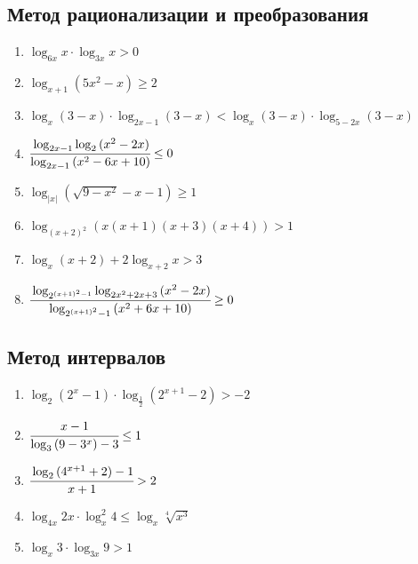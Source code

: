 \documentclass[12pt]{article}
\begin{document}
\subsection{Метод рационализации и преобразования}
 \begin{enumerate}[start=1,label={\itshape\bfseries \arabic*.}]
    \item $\log_{6x}{x} \cdot \log_{3x}{x} > 0$
    \item $\log_{x + 1}{(5x^2 - x)} \ge 2$
    \item $\log_x{(3 - x)} \cdot \log_{2x - 1}{(3 - x)} < \log_x{(3 - x)} \cdot \log_{5 - 2x}{(3 - x)}$
    \item $\cfrac{\log_{2x - 1}\log_2{(x^2 - 2x)}}{\log_{2x - 1}{(x^2 - 6x + 10)}} \le 0$
    \item $\log_{|x|}{(\sqrt{9 - x^2} - x - 1)} \ge 1$
    \item $\log_{(x + 2)^2}{(x(x + 1)(x + 3)(x + 4))} > 1$
    \item $\log_x{(x + 2)} + 2\log_{x + 2}{x} > 3$
    \item $\cfrac{\log_{2^{(x + 1)^2 - 1}}{\log_{2x^2 + 2x + 3}{(x^2 - 2x)}}}{\log_{2^{(x + 1)^2} - 1}{(x^2 + 6x + 10)}} \ge 0$
\end{enumerate}
\subsection{Метод интервалов}
 \begin{enumerate}[start=1,label={\itshape\bfseries \arabic*.}]
    \item $\log_2{(2^x - 1)} \cdot \log_{\frac{1}{2}}{(2^{x + 1} - 2)} > -2$
    \item $\cfrac{x - 1}{\log_3{(9 - 3^x)} - 3} \le 1$
    \item $\cfrac{\log_2{(4^{x + 1} + 2)} - 1}{x + 1} > 2$
    \item $\log_{4x}{2x} \cdot \log^2_{x}{4} \le \log_x{\sqrt[4]{x^3}}$
    \item $\log_x{3} \cdot \log_{3x}{9} > 1$
\end{enumerate}
\end{document}
